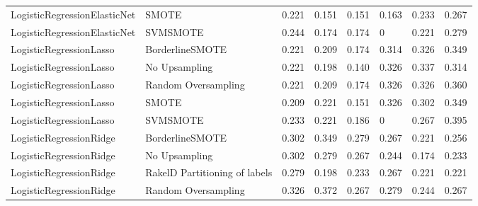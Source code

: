 \begin{tabular}{llllllll}
   LogisticRegressionElasticNet &                         SMOTE & 0.221 &                     0.151 &                 0.151 &                  0.163 &                                   0.233 &     0.267 \\
   LogisticRegressionElasticNet &                      SVMSMOTE & 0.244 &                     0.174 &                 0.174 &                      0 &                                   0.221 &     0.279 \\
        LogisticRegressionLasso &               BorderlineSMOTE & 0.221 &                     0.209 &                 0.174 &                  0.314 &                                   0.326 &     0.349 \\
        LogisticRegressionLasso &                 No Upsampling & 0.221 &                     0.198 &                 0.140 &                  0.326 &                                   0.337 &     0.314 \\
        LogisticRegressionLasso &           Random Oversampling & 0.221 &                     0.209 &                 0.174 &                  0.326 &                                   0.326 &     0.360 \\
        LogisticRegressionLasso &                         SMOTE & 0.209 &                     0.221 &                 0.151 &                  0.326 &                                   0.302 &     0.349 \\
        LogisticRegressionLasso &                      SVMSMOTE & 0.233 &                     0.221 &                 0.186 &                      0 &                                   0.267 &     0.395 \\
        LogisticRegressionRidge &               BorderlineSMOTE & 0.302 &                     0.349 &                 0.279 &                  0.267 &                                   0.221 &     0.256 \\
        LogisticRegressionRidge &                 No Upsampling & 0.302 &                     0.279 &                 0.267 &                  0.244 &                                   0.174 &     0.233 \\
        LogisticRegressionRidge & RakelD Partitioning of labels & 0.279 &                     0.198 &                 0.233 &                  0.267 &                                   0.221 &     0.221 \\
        LogisticRegressionRidge &           Random Oversampling & 0.326 &                     0.372 &                 0.267 &                  0.279 &                                   0.244 &     0.267 \\

\end{tabular}
